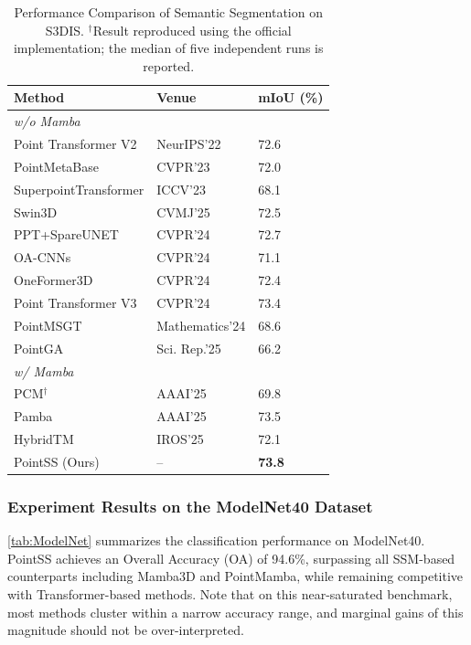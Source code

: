 \documentclass[a4paper,fleqn]{cas-sc}
\begin{document}
\begin{table}
	\centering
	\caption{Performance Comparison of Semantic Segmentation on S3DIS. $^\dagger$Result reproduced using the official implementation; the median of five independent runs is reported.}
	\label{tab:s3dis}
	\begin{tabular}{@{}lll@{}}
		\toprule
		\textbf{Method} & \textbf{Venue} & \textbf{mIoU (\%)} \\ \midrule
		\multicolumn{3}{l}{\textit{w/o Mamba}} \\
		Point Transformer V2\cite{ptv2} & NeurIPS'22 & 72.6 \\
		PointMetaBase\cite{pmb} & CVPR'23 & 72.0 \\
		SuperpointTransformer\cite{spt} & ICCV'23 & 68.1 \\
		Swin3D\cite{Swin3D} & CVMJ'25 & 72.5 \\
		PPT+SpareUNET\cite{ppt} & CVPR'24 & 72.7 \\
		OA-CNNs\cite{oacnn} & CVPR'24 & 71.1 \\
		OneFormer3D\cite{OneFormer3D} & CVPR'24 & 72.4 \\
		Point Transformer V3\cite{ptv3} & CVPR'24 & 73.4 \\
		PointMSGT\cite{pointmsgt} & Mathematics'24 & 68.6 \\
		PointGA\cite{pointga} & Sci. Rep.'25 & 66.2 \\ \midrule
		\multicolumn{3}{l}{\textit{w/ Mamba}} \\
		PCM$^\dagger$\cite{pcm} & AAAI'25 & 69.8 \\
		Pamba\cite{pamba} & AAAI'25 & 73.5 \\
		HybridTM\cite{hybridtm} & IROS'25 & 72.1 \\
		PointSS (Ours) & -- & \textbf{73.8} \\ \bottomrule
	\end{tabular}
\end{table}

\subsubsection{Experiment Results on the ModelNet40 Dataset}

\cref{tab:ModelNet} summarizes the classification performance on ModelNet40. PointSS achieves an Overall Accuracy (OA) of 94.6\%, surpassing all SSM-based counterparts including Mamba3D and PointMamba, while remaining competitive with Transformer-based methods. Note that on this near-saturated benchmark, most methods cluster within a narrow accuracy range, and marginal gains of this magnitude should not be over-interpreted.
\end{document}
